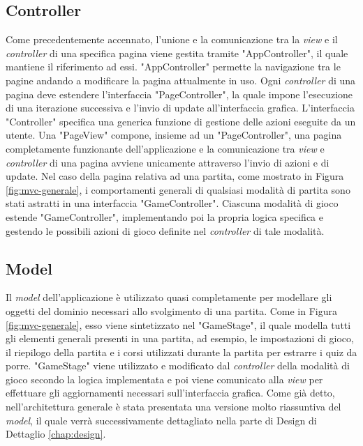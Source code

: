     \subsection{Controller}
        Come precedentemente accennato, l'unione e la comunicazione tra la \textit{view} e il \textit{controller} di una specifica pagina viene gestita tramite "AppController", il quale mantiene il riferimento ad essi. "AppController" permette la navigazione tra le pagine andando a modificare la pagina attualmente in uso.
        Ogni \textit{controller} di una pagina deve estendere l'interfaccia "PageController", la quale impone l'esecuzione di una iterazione successiva e l'invio di update all'interfaccia grafica. L'interfaccia "Controller" specifica una generica funzione di gestione delle azioni eseguite da un utente.
        Una "PageView" compone, insieme ad un "PageController", una pagina completamente funzionante dell'applicazione e la comunicazione tra \textit{view} e \textit{controller} di una pagina avviene unicamente attraverso l'invio di azioni e di update. Nel caso della pagina relativa ad una partita, come mostrato in Figura \ref{fig:mvc-generale}, i comportamenti generali di qualsiasi modalità di partita sono stati astratti in una interfaccia "GameController". Ciascuna modalità di gioco estende "GameController", implementando poi la propria logica specifica e gestendo le possibili azioni di gioco definite nel \textit{controller} di tale modalità.
 
    \subsection{Model}
        Il \textit{model} dell'applicazione è utilizzato quasi completamente per modellare gli oggetti del dominio necessari allo svolgimento di una partita.
        Come in Figura \ref{fig:mvc-generale}, esso viene sintetizzato nel "GameStage", il quale modella tutti gli elementi generali presenti in una partita, ad esempio, le impostazioni di gioco, il riepilogo della partita e i corsi utilizzati durante la partita per estrarre i quiz da porre. "GameStage" viene utilizzato e modificato dal \textit{controller} della modalità di gioco secondo la logica implementata e poi viene comunicato alla \textit{view} per effettuare gli aggiornamenti necessari sull'interfaccia grafica. Come già detto, nell'architettura generale è stata presentata una versione molto riassuntiva del \textit{model}, il quale verrà successivamente dettagliato nella parte di Design di Dettaglio \ref{chap:design}.